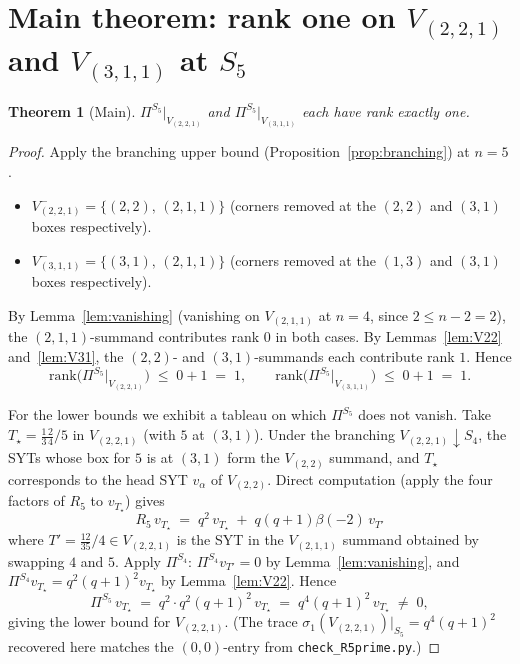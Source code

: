 \documentclass[11pt]{article}
\newtheorem{theorem}{Theorem}
\theoremstyle{definition}
\newcommand{\Pis}[1]{\Pi^{S_{#1}}}
\begin{document}
\section{Main theorem: rank one on $V_{(2,2,1)}$ and $V_{(3,1,1)}$ at $S_5$}

\begin{theorem}[Main]\label{thm:main}
$\Pis{5}\big|_{V_{(2,2,1)}}$ and $\Pis{5}\big|_{V_{(3,1,1)}}$ each have
rank exactly one.
\end{theorem}

\begin{proof}
Apply the branching upper bound (Proposition~\ref{prop:branching}) at $n=5$.
\begin{itemize}[leftmargin=2em,topsep=0.2em,itemsep=0.1em]
\item $V_{(2,2,1)}^- = \{(2,2),\, (2,1,1)\}$ (corners removed at the
  $(2,2)$ and $(3,1)$ boxes respectively).
\item $V_{(3,1,1)}^- = \{(3,1),\, (2,1,1)\}$ (corners removed at the
  $(1,3)$ and $(3,1)$ boxes respectively).
\end{itemize}
By Lemma~\ref{lem:vanishing} (vanishing on $V_{(2,1,1)}$ at $n=4$, since
$2 \le n-2 = 2$), the $(2,1,1)$-summand contributes rank $0$ in both cases.
By Lemmas~\ref{lem:V22} and~\ref{lem:V31}, the $(2,2)$- and
$(3,1)$-summands each contribute rank $1$. Hence
\[
\mathrm{rank}\bigl(\Pis{5}\big|_{V_{(2,2,1)}}\bigr) \;\le\; 0 + 1 \;=\; 1,
\qquad
\mathrm{rank}\bigl(\Pis{5}\big|_{V_{(3,1,1)}}\bigr) \;\le\; 0 + 1 \;=\; 1.
\]

For the lower bounds we exhibit a tableau on which $\Pis{5}$ does not
vanish. Take $T_\star = \tfrac{1\,2}{3\,4}/5$ in $V_{(2,2,1)}$ (with
$5$ at $(3,1)$). Under the branching $V_{(2,2,1)}{\downarrow}S_4$, the
SYTs whose box for $5$ is at $(3,1)$ form the $V_{(2,2)}$ summand, and
$T_\star$ corresponds to the head SYT $v_\alpha$ of $V_{(2,2)}$. Direct
computation (apply the four factors of $R_5$ to $v_{T_\star}$) gives
\[
R_5\, v_{T_\star} \;=\; q^2\, v_{T_\star} \;+\; q(q+1)\beta(-2)\, v_{T'}
\]
where $T' = \tfrac{12}{35}/4 \in V_{(2,2,1)}$ is the SYT in the $V_{(2,1,1)}$
summand obtained by swapping $4$ and $5$. Apply $\Pis{4}$:
$\Pis{4} v_{T'} = 0$ by Lemma~\ref{lem:vanishing}, and $\Pis{4} v_{T_\star} = q^2(q+1)^2 v_{T_\star}$ by Lemma~\ref{lem:V22}.
Hence
\[
\Pis{5}\, v_{T_\star} \;=\; q^2 \cdot q^2(q+1)^2\, v_{T_\star}
  \;=\; q^4(q+1)^2\, v_{T_\star} \;\neq\; 0,
\]
giving the lower bound for $V_{(2,2,1)}$. (The trace
$\sigma_1(V_{(2,2,1)})|_{S_5} = q^4(q+1)^2$ recovered here matches the
$(0,0)$-entry from \texttt{check\_R5prime.py}.)


\end{proof}
\end{document}
